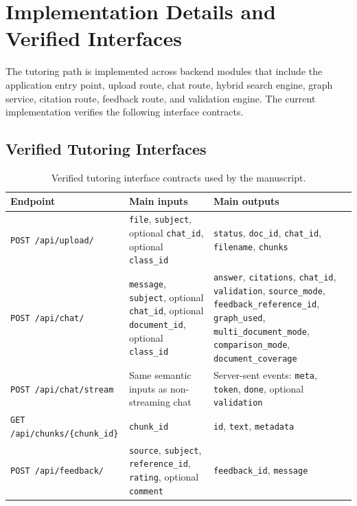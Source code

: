 \documentclass[11pt,a4paper]{article}
\begin{document}
\section{Implementation Details and Verified Interfaces}

The tutoring path is implemented across backend modules that include the application entry point, upload route, chat route, hybrid search engine, graph service, citation route, feedback route, and validation engine. The current implementation verifies the following interface contracts.

\subsection{Verified Tutoring Interfaces}

\begin{table}[h!]
\centering
\small
\caption{Verified tutoring interface contracts used by the manuscript.}
\begin{tabular}{|p{2.7cm}|p{5.0cm}|p{5.2cm}|}
\hline
\textbf{Endpoint} & \textbf{Main inputs} & \textbf{Main outputs} \\
\hline
\texttt{POST /api/upload/} & \texttt{file}, \texttt{subject}, optional \texttt{chat\_id}, optional \texttt{class\_id} & \texttt{status}, \texttt{doc\_id}, \texttt{chat\_id}, \texttt{filename}, \texttt{chunks} \\
\hline
\texttt{POST /api/chat/} & \texttt{message}, \texttt{subject}, optional \texttt{chat\_id}, optional \texttt{document\_id}, optional \texttt{class\_id} & \texttt{answer}, \texttt{citations}, \texttt{chat\_id}, \texttt{validation}, \texttt{source\_mode}, \texttt{feedback\_reference\_id}, \texttt{graph\_used}, \texttt{multi\_document\_mode}, \texttt{comparison\_mode}, \texttt{document\_coverage} \\
\hline
\texttt{POST /api/chat/stream} & Same semantic inputs as non-streaming chat & Server-sent events: \texttt{meta}, \texttt{token}, \texttt{done}, optional \texttt{validation} \\
\hline
\texttt{GET /api/chunks/\{chunk\_id\}} & \texttt{chunk\_id} & \texttt{id}, \texttt{text}, \texttt{metadata} \\
\hline
\texttt{POST /api/feedback/} & \texttt{source}, \texttt{subject}, \texttt{reference\_id}, \texttt{rating}, optional \texttt{comment} & \texttt{feedback\_id}, \texttt{message} \\
\hline
\end{tabular}
\label{tab:interfaces}
\end{table}
\end{document}
